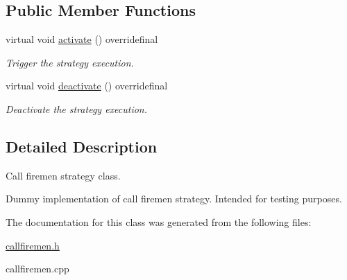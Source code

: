 \subsection*{Public Member Functions}
\begin{DoxyCompactItemize}
\item 
virtual void \hyperlink{classCallFiremen_a945957ae143d5047448cc907edf5e6e2}{activate} () overridefinal\hypertarget{classCallFiremen_a945957ae143d5047448cc907edf5e6e2}{}\label{classCallFiremen_a945957ae143d5047448cc907edf5e6e2}

\begin{DoxyCompactList}\small\item\em Trigger the strategy execution. \end{DoxyCompactList}\item 
virtual void \hyperlink{classCallFiremen_a02da7475703fef2e8dc2c42cd0400ecb}{deactivate} () overridefinal\hypertarget{classCallFiremen_a02da7475703fef2e8dc2c42cd0400ecb}{}\label{classCallFiremen_a02da7475703fef2e8dc2c42cd0400ecb}

\begin{DoxyCompactList}\small\item\em Deactivate the strategy execution. \end{DoxyCompactList}\end{DoxyCompactItemize}


\subsection{Detailed Description}
Call firemen strategy class. 

Dummy implementation of call firemen strategy. Intended for testing purposes. 

The documentation for this class was generated from the following files\+:\begin{DoxyCompactItemize}
\item 
\hyperlink{callfiremen_8h}{callfiremen.\+h}\item 
callfiremen.\+cpp\end{DoxyCompactItemize}
